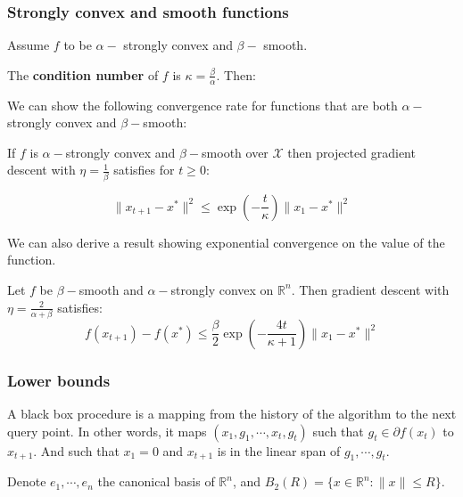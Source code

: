 \subsubsection{Strongly convex and smooth functions}

Assume $f$ to be $\alpha-$ strongly convex and $\beta-$ smooth. 

\begin{definition}
The \textbf{condition number} of $f$ is $\kappa = \frac{\beta}{\alpha}$. Then:
\end{definition}

We can show the following convergence rate for functions that are both $\alpha-$strongly convex and $\beta-$smooth:

\begin{theorem}
If $f$ is $\alpha-$strongly convex and $\beta-$smooth over $\mathcal{X}$ then projected gradient descent with $\eta = \frac{1}{\beta}$ satisfies for $t \geq 0$:

\begin{equation}
\parallel x_{t+1} - x^*\parallel^2 \leq \exp(-\frac{t}{\kappa})\parallel x_1 - x^*\parallel^2
\end{equation}


\end{theorem}

We can also derive a result showing exponential convergence on the value of the function. 

\begin{theorem}
Let $f$ be $\beta-$smooth and $\alpha-$strongly convex on $\mathbb{R}^n$. Then gradient descent with $\eta = \frac{2}{\alpha+\beta}$ satisfies:
\begin{equation}
f(x_{t+1}) - f(x^*) \leq \frac{\beta}{2} \exp( -\frac{4t}{\kappa + 1}) \parallel x_1 - x^* \parallel^2
\end{equation}
\end{theorem}



\subsubsection{Lower bounds}

A black box procedure is a mapping from the history of the algorithm to the next query point. In other words, it maps $(x_1, g_1, \cdots, x_t, g_t)$ such that $g_t \in \partial f(x_t)$ to $x_{t+1}$. And such that $x_1 = 0$ and $x_{t+1}$ is in the linear span of $g_1, \cdots, g_t$. 

Denote $e_1, \cdots, e_n$ the canonical basis of $\mathbb{R}^n$, and $B_2(R) = \{ x \in \mathbb{R}^n : \parallel x \parallel \leq R\}$. 

